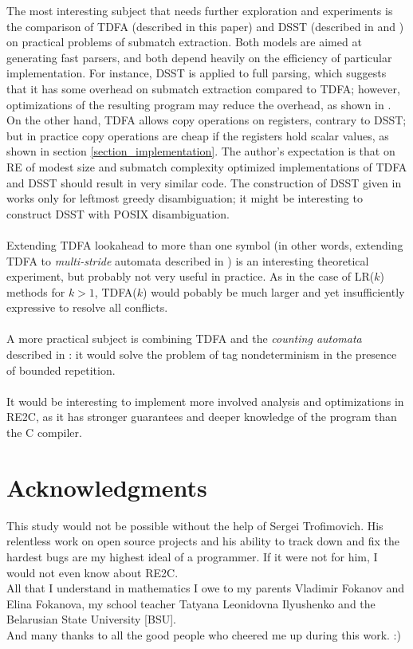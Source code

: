 \documentclass{article}
\theoremstyle{definition}
\begin{document}
\begin{multicols}{2}
The most interesting subject that needs further exploration and experiments
is the comparison of TDFA (described in this paper) and DSST (described in \cite{Gra15} and \cite{GHRST16})
on practical problems of submatch extraction.
Both models are aimed at generating fast parsers,
and both depend heavily on the efficiency of particular implementation.
For instance, DSST is applied to full parsing, which suggests that it has some overhead on submatch extraction compared to TDFA;
however, optimizations of the resulting program may reduce the overhead, as shown in \cite{Gra15}.
On the other hand, TDFA allows copy operations on registers, contrary to DSST;
but in practice copy operations are cheap if the registers hold scalar values, as shown in section \ref{section_implementation}.
The author's expectation is that on RE of modest size and submatch complexity
optimized implementations of TDFA and DSST should result in very similar code.
The construction of DSST given in \cite{Gra15} works only for leftmost greedy disambiguation;
it might be interesting to construct DSST with POSIX disambiguation.
\\ \\
Extending TDFA lookahead to more than one symbol (in other words, extending TDFA to \emph{multi-stride} automata described in \cite{Bec09})
is an interesting theoretical experiment, but probably not very useful in practice.
As in the case of LR($k$) methods for $k > 1$, TDFA($k$) would pobably be much larger and yet insufficiently expressive to resolve all conflicts.
\\ \\
A more practical subject is combining TDFA and the \emph{counting automata} described in \cite{Bec09}:
it would solve the problem of tag nondeterminism in the presence of bounded repetition.
\\ \\
It would be interesting to implement more involved analysis and optimizations in RE2C,
as it has stronger guarantees and deeper knowledge of the program than the C compiler.

\section*{Acknowledgments}

This study would not be possible without the help of Sergei Trofimovich.
His relentless work on open source projects
and his ability to track down and fix the hardest bugs are my highest ideal of a programmer.
If it were not for him, I would not even know about RE2C.
\\

All that I understand in mathematics I owe to my parents Vladimir Fokanov and Elina Fokanova,
my school teacher Tatyana Leonidovna Ilyushenko
and the Belarusian State University [BSU].
\\

And many thanks to all the good people who cheered me up during this work. :)

\end{multicols}
\pagebreak
\end{document}
